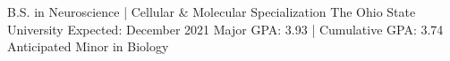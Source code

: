 


\begin{cventries}

  \cventry
    {B.S. in Neuroscience | Cellular \& Molecular Specialization} %
    {The Ohio State University} %
    {Expected: December 2021} %
    {Major GPA: 3.93 | Cumulative GPA: 3.74}
    {Anticipated Minor in Biology}
\end{cventries}
